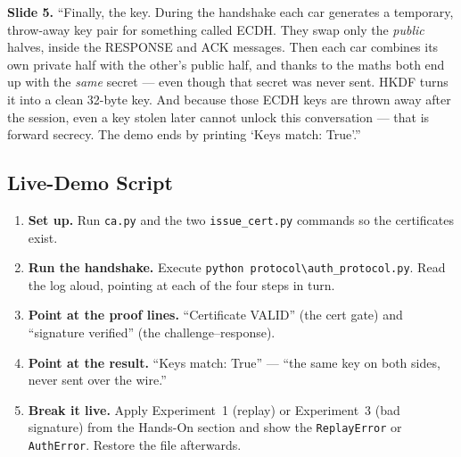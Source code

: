 \documentclass[11pt,a4paper]{article}
\begin{document}
\textbf{Slide 5.} ``Finally, the key. During the handshake each car generates a
temporary, throw-away key pair for something called ECDH. They swap only the
\emph{public} halves, inside the RESPONSE and ACK messages. Then each car
combines its own private half with the other's public half, and thanks to the
maths both end up with the \emph{same} secret --- even though that secret was
never sent. HKDF turns it into a clean 32-byte key. And because those ECDH keys
are thrown away after the session, even a key stolen later cannot unlock this
conversation --- that is forward secrecy. The demo ends by printing `Keys match:
True'.''

\subsection{Live-Demo Script}
\begin{enumerate}
  \item \textbf{Set up.} Run \texttt{ca.py} and the two \texttt{issue\_cert.py}
        commands so the certificates exist.
  \item \textbf{Run the handshake.} Execute \texttt{python
        protocol\textbackslash auth\_protocol.py}. Read the log aloud, pointing
        at each of the four steps in turn.
  \item \textbf{Point at the proof lines.} ``Certificate VALID'' (the cert gate)
        and ``signature verified'' (the challenge--response).
  \item \textbf{Point at the result.} ``Keys match: True'' --- ``the same key on
        both sides, never sent over the wire.''
  \item \textbf{Break it live.} Apply Experiment~1 (replay) or Experiment~3 (bad
        signature) from the Hands-On section and show the \texttt{ReplayError} or
        \texttt{AuthError}. Restore the file afterwards.
\end{enumerate}
\end{document}
